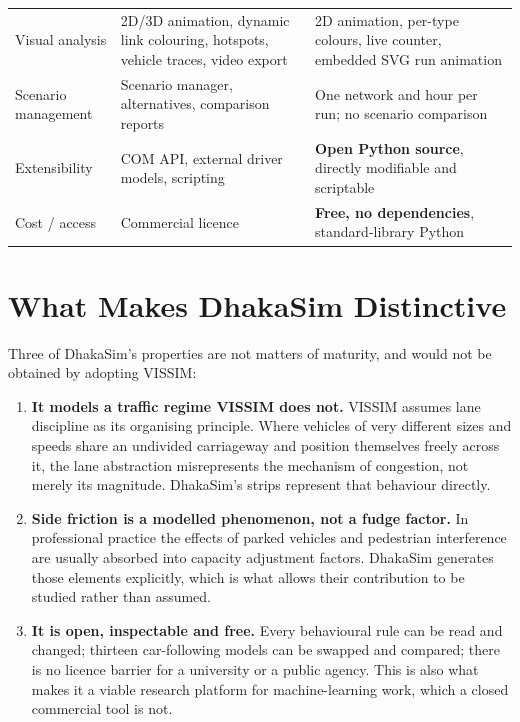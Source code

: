 \documentclass[11pt,a4paper]{article}
\begin{document}
\begin{longtable}{@{}p{}p{}p{}@{}}
Visual analysis &
2D/3D animation, dynamic link colouring, hotspots, vehicle traces, video export &
2D animation, per-type colours, live counter, embedded SVG run animation \\
\addlinespace
Scenario management &
Scenario manager, alternatives, comparison reports &
One network and hour per run; no scenario comparison \\
\addlinespace
Extensibility &
COM API, external driver models, scripting &
\textbf{Open Python source}, directly modifiable and scriptable \\
\addlinespace
Cost / access &
Commercial licence &
\textbf{Free, no dependencies}, standard-library Python \\
\bottomrule
\end{longtable}

\section{What Makes DhakaSim Distinctive}
Three of DhakaSim's properties are not matters of maturity, and would not be obtained
by adopting VISSIM:

\begin{enumerate}
  \item \textbf{It models a traffic regime VISSIM does not.} VISSIM assumes lane
        discipline as its organising principle. Where vehicles of very different
        sizes and speeds share an undivided carriageway and position themselves
        freely across it, the lane abstraction misrepresents the mechanism of
        congestion, not merely its magnitude. DhakaSim's strips represent that
        behaviour directly.
  \item \textbf{Side friction is a modelled phenomenon, not a fudge factor.} In
        professional practice the effects of parked vehicles and pedestrian
        interference are usually absorbed into capacity adjustment factors.
        DhakaSim generates those elements explicitly, which is what allows their
        contribution to be studied rather than assumed.
  \item \textbf{It is open, inspectable and free.} Every behavioural rule can be
        read and changed; thirteen car-following models can be swapped and compared;
        there is no licence barrier for a university or a public agency. This is
        also what makes it a viable research platform for machine-learning work,
        which a closed commercial tool is not.
\end{enumerate}
\end{document}
